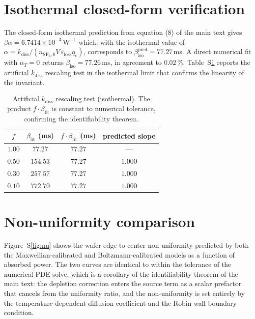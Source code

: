 \documentclass[11pt,a4paper]{article}
\newcommand{\kdiss}{k_{\mathrm{diss}}}
\begin{document}
\section{Isothermal closed-form verification}
\label{sec:SI-isothermal}

The closed-form isothermal prediction from equation (8) of the
main text gives
$\beta\alpha = 6.7414\times 10^{-3}\,\mathrm{W}^{-1}$ which, with
the isothermal value of
$\alpha = \kdiss/(n_{\mathrm{SF}_6,0}V\,\varepsilon_{\mathrm{loss}}q_e)$,
corresponds to $\beta_{\mathrm{iso}}^{\mathrm{pred}} = 77.27\,$ms.
A direct numerical fit with $\alpha_T = 0$ returns
$\beta_{\mathrm{iso}} = 77.26\,$ms, in agreement to $0.02\,\%$.
Table~S\ref{tab:SI-scaling} reports the artificial $\kdiss$
rescaling test in the isothermal limit that confirms the linearity
of the invariant.

\begin{table}[h]
  \centering
  \caption{Artificial $\kdiss$ rescaling test (isothermal). The
  product $f\cdot\beta_{\mathrm{fit}}$ is constant to numerical
  tolerance, confirming the identifiability theorem.}
  \label{tab:SI-scaling}
  \begin{tabular}{cccc}
    \toprule
    $f$     & $\beta_{\mathrm{fit}}$ (ms)
            & $f\cdot\beta_{\mathrm{fit}}$ (ms)
            & predicted slope \\
    \midrule
    $1.00$  & $77.27$   & $77.27$ & --- \\
    $0.50$  & $154.53$  & $77.27$ & $1.000$ \\
    $0.30$  & $257.57$  & $77.27$ & $1.000$ \\
    $0.10$  & $772.70$  & $77.27$ & $1.000$ \\
    \bottomrule
  \end{tabular}
\end{table}

\section{Non-uniformity comparison}
\label{sec:SI-nu}

Figure~S\ref{fig:nu} shows the wafer-edge-to-center
non-uniformity predicted by both the Maxwellian-calibrated and
Boltzmann-calibrated models as a function of absorbed power. The
two curves are identical to within the tolerance of the numerical
PDE solve, which is a corollary of the identifiability theorem of
the main text: the depletion correction enters the source term as
a scalar prefactor that cancels from the uniformity ratio, and the
non-uniformity is set entirely by the temperature-dependent
diffusion coefficient and the Robin wall boundary condition.
\end{document}
